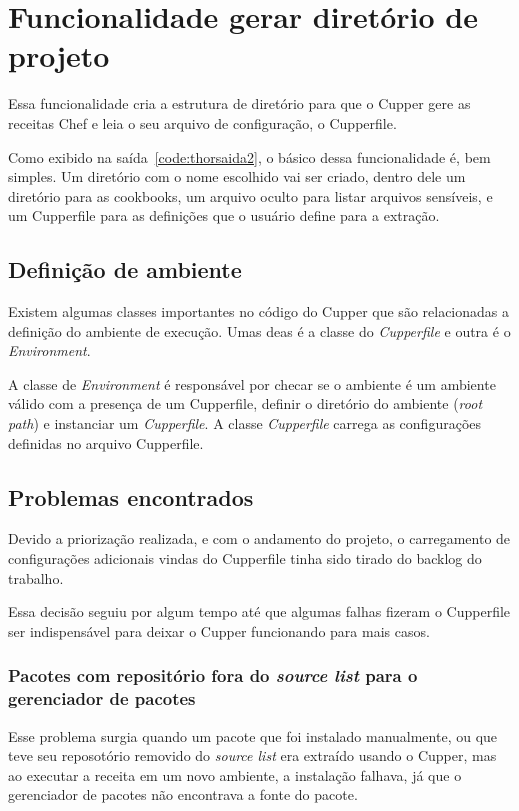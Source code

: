 \section{Funcionalidade gerar diretório de projeto}
\label{sec:proj}

Essa funcionalidade cria a estrutura de diretório para que o Cupper gere as 
receitas Chef e leia o seu arquivo de configuração, o Cupperfile.

Como exibido na saída~\ref{code:thorsaida2}, o básico dessa funcionalidade é, bem
simples. Um diretório com o nome escolhido vai ser criado, dentro dele um diretório
para as cookbooks, um arquivo oculto para listar arquivos sensíveis, e um 
Cupperfile para as definições que o usuário define para a extração.

\subsection{Definição de ambiente}
Existem algumas classes importantes no código do Cupper que são relacionadas a
definição do ambiente de execução. Umas deas é a classe do \textit{Cupperfile} e outra
é o \textit{Environment}.

A classe de \textit{Environment} é responsável por checar se o ambiente é um
ambiente válido com a presença de um Cupperfile, definir o diretório do ambiente
(\textit{root\underline{ }path}) e instanciar um \textit{Cupperfile}. A classe \textit{Cupperfile} carrega as configurações definidas no arquivo Cupperfile.

\subsection{Problemas encontrados}
Devido a priorização realizada, e com o andamento do projeto, o carregamento de
configurações adicionais vindas do Cupperfile tinha sido tirado do backlog do
trabalho.

Essa decisão seguiu por algum tempo até que algumas falhas fizeram o Cupperfile
ser indispensável para deixar o Cupper funcionando para mais casos.

\subsubsection{Pacotes com repositório fora do \textit{source list} para o 
gerenciador de pacotes}
Esse problema surgia quando um pacote que foi instalado manualmente, ou que
teve seu reposotório removido do \textit{source list} era extraído usando o Cupper,
mas ao executar a receita em um novo ambiente, a instalação falhava, já que 
o gerenciador de pacotes não encontrava a fonte do pacote.

